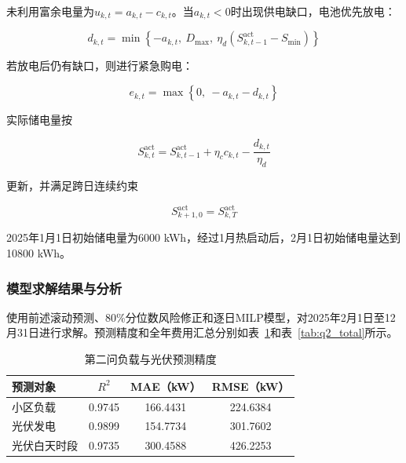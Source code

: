 \documentclass[UTF8]{ctexart}
\begin{document}
    未利用富余电量为$u_{k,t}=a_{k,t}-c_{k,t}$。当$a_{k,t}<0$时出现供电缺口，电池优先放电：
    
    \begin{equation}
        d_{k,t}
        =\min\left\{
        -a_{k,t},\ 
        D_{\max},\ 
        \eta_d\left(S_{k,t-1}^{\mathrm{act}}-S_{\min}\right)
        \right\}
    \end{equation}
    
    若放电后仍有缺口，则进行紧急购电：
    
    \begin{equation}
        e_{k,t}
        =\max\left\{0,\ -a_{k,t}-d_{k,t}\right\}
    \end{equation}
    
    实际储电量按
    
    \begin{equation}
        S_{k,t}^{\mathrm{act}}
        =S_{k,t-1}^{\mathrm{act}}
        +\eta_cc_{k,t}
        -\frac{d_{k,t}}{\eta_d}
    \end{equation}
    
    更新，并满足跨日连续约束
    
    \begin{equation}
        S_{k+1,0}^{\mathrm{act}}=S_{k,T}^{\mathrm{act}}
    \end{equation}
    
    2025年1月1日初始储电量为6000 kWh，经过1月热启动后，2月1日初始储电量达到10800 kWh。\par
    
    \subsubsection{模型求解结果与分析}
    
    使用前述滚动预测、80\%分位数风险修正和逐日MILP模型，对2025年2月1日至12月31日进行求解。预测精度和全年费用汇总分别如表~\ref{tab:q2_prediction}和表~\ref{tab:q2_total}所示。\par
    
    \begin{table}[htbp]
        \centering
        \caption{第二问负载与光伏预测精度}
        \label{tab:q2_prediction}
        \begin{tabular}{lccc}
            \toprule
            预测对象 & $R^2$ & MAE（kW） & RMSE（kW）\\
            \midrule
            小区负载 & 0.9745 & 166.4431 & 224.6384\\
            光伏发电 & 0.9899 & 154.7734 & 301.7602\\
            光伏白天时段 & 0.9735 & 300.4588 & 426.2253\\
            \bottomrule
        \end{tabular}
    \end{table}
    
\end{document}
